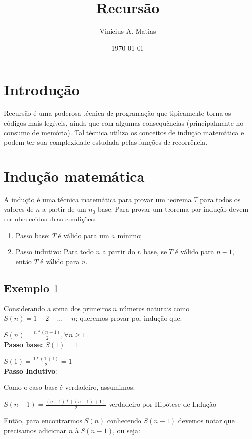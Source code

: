 \documentclass[a4paper, twocolumn]{article}
\title{Recursão}
\author{Vinicius A. Matias}
\date{\today}
\theoremstyle{definition}
\begin{document}
	\maketitle
	

\section{Introdução}
	Recursão é uma poderosa técnica de programação que tipicamente torna os códigos mais legíveis, ainda que com algumas consequências (principalmente no consumo de memória). Tal técnica utiliza os conceitos de indução matemática e podem ter sua complexidade estudada pelas funções de recorrência.
	
\section{Indução matemática}
	A indução é uma técnica matemática para provar um teorema $T$ para todos os valores de $n$ a partir de um $n_0$ base. Para provar um teorema por indução devem ser obedecidas duas condições:

\begin{enumerate}
	\item Passo base: $T$ é válido para um $n$ mínimo;
	\item Passo indutivo: Para todo $n$ a partir do $n$ base, se $T$ é válido para $n-1$, então $T$ é válido para $n$.
\end{enumerate}

\subsection{Exemplo 1 }
	Considerando a soma dos primeiros $n$ números naturais como $S(n) = 1 + 2 +...+ n$; queremos provar por indução que:
	
	$S(n) = \frac{n*(n+1)}{2}, \forall n \geq 1$ \\
	
	\textbf{Passo base:} $S(1) = 1$
	
	$S(1) = \frac{1*(1+1)}{2} = 1$ \\
	
	\textbf{Passo Indutivo:}
	
	Como o caso base é verdadeiro, assumimos:
	
	$S(n-1) =\frac{(n-1) * ((n-1)+1)}{2}$ verdadeiro por Hipótese de Indução 
	
	Então, para encontrarmos $S(n)$ conhecendo $S(n-1)$ devemos notar que precisamos adicionar $n$ à $S(n-1)$, ou seja:
	
\end{document}
